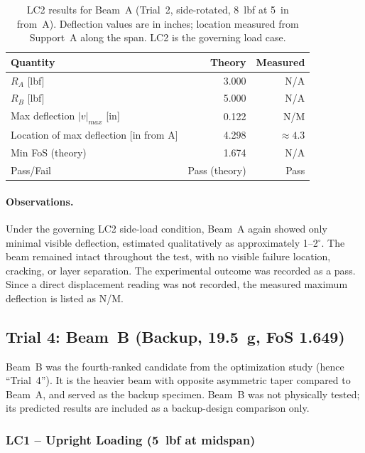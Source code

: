 \documentclass[11pt,letterpaper]{article}
\begin{document}
\begin{table}[H]
\centering
\caption{LC2 results for Beam~A (Trial~2, side-rotated, 8~lbf at 5~in from~A).
Deflection values are in inches; location measured from Support~A along the span.
LC2 is the governing load case.}
\label{tab:testA_lc2}
\begin{tabular}{lrr}
\toprule
Quantity & Theory & Measured \\
\midrule
$R_A$ [lbf]                   & 3.000 & N/A \\
$R_B$ [lbf]                   & 5.000 & N/A \\
Max deflection $|v|_{max}$ [in] & 0.122 & N/M \\
Location of max deflection [in from A] & 4.298 & $\approx 4.3$ \\
Min FoS (theory)              & 1.674 & N/A \\
Pass/Fail                     & Pass (theory) & Pass \\
\bottomrule
\end{tabular}
\end{table}

\paragraph{Observations.}
Under the governing LC2 side-load condition, Beam~A again showed only minimal
visible deflection, estimated qualitatively as approximately 1--2$^\circ$.
The beam remained intact throughout the test, with no visible failure location,
cracking, or layer separation.  The experimental outcome was recorded as a
pass.  Since a direct displacement reading was not recorded, the measured
maximum deflection is listed as N/M.

\subsection{Trial 4: Beam~B (Backup, 19.5~g, FoS 1.649)}

Beam~B was the fourth-ranked candidate from the optimization study (hence
``Trial~4'').  It is the heavier beam with opposite asymmetric taper compared
to Beam~A, and served as the backup specimen.
Beam~B was not physically tested; its predicted results are included as a
backup-design comparison only.

\subsubsection{LC1 -- Upright Loading (5~lbf at midspan)}
\end{document}
